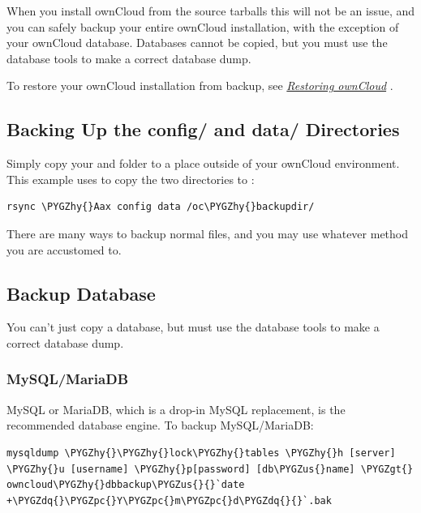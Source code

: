 \documentclass[letterpaper,10pt,english]{sphinxmanual}
\def\PYGZus{\char`\_}
\def\PYGZgt{\char`\>}
\def\PYGZpc{\char`\%}
\def\PYGZhy{\char`\-}
\def\PYGZdq{\char`\"}
\begin{document}
When you install ownCloud from the source tarballs this will not be an issue, and you can safely backup your entire ownCloud installation, with the exception of your ownCloud database. Databases cannot be copied, but you must use the database tools to make a correct database dump.

To restore your ownCloud installation from backup, see {\hyperref[maintenance/restore::doc]{\emph{Restoring ownCloud}}} .


\subsection{Backing Up the config/ and data/ Directories}
\label{maintenance/backup:backing-up-the-config-and-data-directories}
Simply copy your  and  folder to a place outside of your ownCloud environment. This example uses  to copy the two directories to :

\begin{Verbatim}[commandchars=\\\{\}]
rsync \PYGZhy{}Aax config data /oc\PYGZhy{}backupdir/
\end{Verbatim}

There are many ways to backup normal files, and you may use whatever method you are accustomed to.


\subsection{Backup Database}
\label{maintenance/backup:backup-database}
You can't just copy a database, but must use the database tools to make a correct database dump.


\subsubsection{MySQL/MariaDB}
\label{maintenance/backup:mysql-mariadb}
MySQL or MariaDB, which is a drop-in MySQL replacement, is the recommended database engine. To backup MySQL/MariaDB:

\begin{Verbatim}[commandchars=\\\{\}]
mysqldump \PYGZhy{}\PYGZhy{}lock\PYGZhy{}tables \PYGZhy{}h [server] \PYGZhy{}u [username] \PYGZhy{}p[password] [db\PYGZus{}name] \PYGZgt{} owncloud\PYGZhy{}dbbackup\PYGZus{}{}`date +\PYGZdq{}\PYGZpc{}Y\PYGZpc{}m\PYGZpc{}d\PYGZdq{}{}`.bak
\end{Verbatim}
\end{document}
